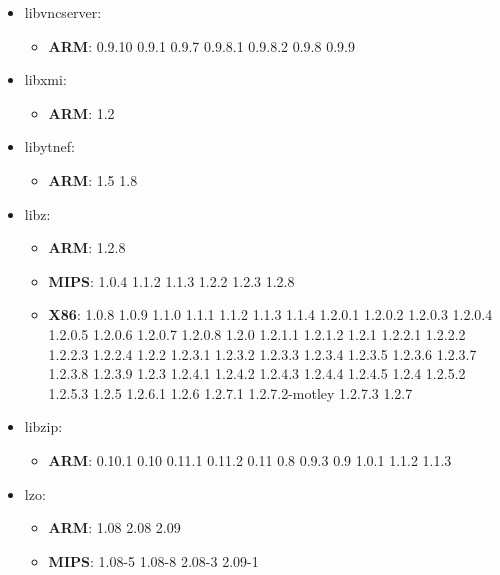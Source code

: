 \documentclass[twocolumn,a4paper]{IEEEtran} %
\begin{document}
\begin{itemize}[noitemsep,topsep=0pt,parsep=0pt,partopsep=0pt]
\item libvncserver:
\begin{itemize}[noitemsep,topsep=0pt,parsep=0pt,partopsep=0pt]
  \item \textbf{ARM}: 0.9.10 0.9.1 0.9.7 0.9.8.1 0.9.8.2 0.9.8 0.9.9
\end{itemize}

\item libxmi:
\begin{itemize}[noitemsep,topsep=0pt,parsep=0pt,partopsep=0pt]
  \item \textbf{ARM}: 1.2
\end{itemize}

\item libytnef:
\begin{itemize}[noitemsep,topsep=0pt,parsep=0pt,partopsep=0pt]
  \item \textbf{ARM}: 1.5 1.8
\end{itemize}

\item libz:
\begin{itemize}[noitemsep,topsep=0pt,parsep=0pt,partopsep=0pt]
  \item \textbf{ARM}: 1.2.8
  \item \textbf{MIPS}: 1.0.4 1.1.2 1.1.3 1.2.2 1.2.3 1.2.8
  \item \textbf{X86}: 1.0.8 1.0.9 1.1.0 1.1.1 1.1.2 1.1.3 1.1.4 1.2.0.1 1.2.0.2 1.2.0.3 1.2.0.4 1.2.0.5 1.2.0.6 1.2.0.7 1.2.0.8 1.2.0 1.2.1.1 1.2.1.2 1.2.1 1.2.2.1 1.2.2.2 1.2.2.3 1.2.2.4 1.2.2 1.2.3.1 1.2.3.2 1.2.3.3 1.2.3.4 1.2.3.5 1.2.3.6 1.2.3.7 1.2.3.8 1.2.3.9 1.2.3 1.2.4.1 1.2.4.2 1.2.4.3 1.2.4.4 1.2.4.5 1.2.4 1.2.5.2 1.2.5.3 1.2.5 1.2.6.1 1.2.6 1.2.7.1 1.2.7.2-motley 1.2.7.3 1.2.7
\end{itemize}

\item libzip:
\begin{itemize}[noitemsep,topsep=0pt,parsep=0pt,partopsep=0pt]
  \item \textbf{ARM}: 0.10.1 0.10 0.11.1 0.11.2 0.11 0.8 0.9.3 0.9 1.0.1 1.1.2 1.1.3
\end{itemize}

\item lzo:
\begin{itemize}[noitemsep,topsep=0pt,parsep=0pt,partopsep=0pt]
  \item \textbf{ARM}: 1.08 2.08 2.09
  \item \textbf{MIPS}: 1.08-5 1.08-8 2.08-3 2.09-1
\end{itemize}


\end{itemize}
\end{document}
